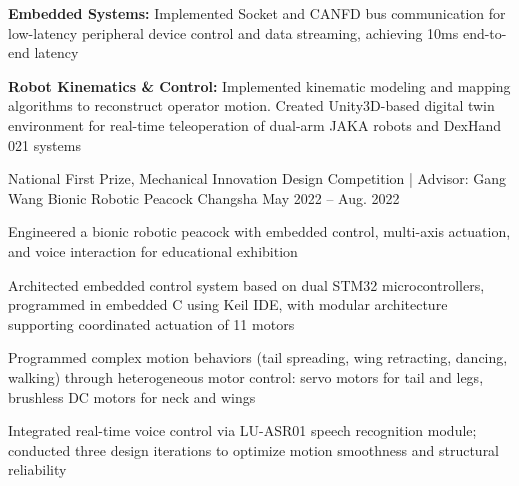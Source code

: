\begin{cventries}
{\begin{cvitems}
        \item{\textbf{Embedded Systems:} Implemented Socket and CANFD bus communication for low-latency peripheral device control and data streaming, achieving 10ms end-to-end latency}
        \item{\textbf{Robot Kinematics \& Control:} Implemented kinematic modeling and mapping algorithms to reconstruct operator motion. Created Unity3D-based digital twin environment for real-time teleoperation of dual-arm JAKA robots and DexHand 021 systems}
      \end{cvitems}
    }
    \cventry
      {National First Prize, Mechanical Innovation Design Competition | Advisor: Gang Wang} %
      {Bionic Robotic Peacock} %
      {Changsha} %
      {May 2022 -- Aug. 2022} %
      {
        Engineered a bionic robotic peacock with embedded control, multi-axis actuation, and voice interaction for educational exhibition
        \begin{cvitems}
          \item{Architected embedded control system based on dual STM32 microcontrollers, programmed in embedded C using Keil IDE, with modular architecture supporting coordinated actuation of 11 motors}
          \item{Programmed complex motion behaviors (tail spreading, wing retracting, dancing, walking) through heterogeneous motor control: servo motors for tail and legs, brushless DC motors for neck and wings}
          \item{Integrated real-time voice control via LU-ASR01 speech recognition module; conducted three design iterations to optimize motion smoothness and structural reliability}
        \end{cvitems}
      \vspace{4mm}
      }
\end{cventries}
